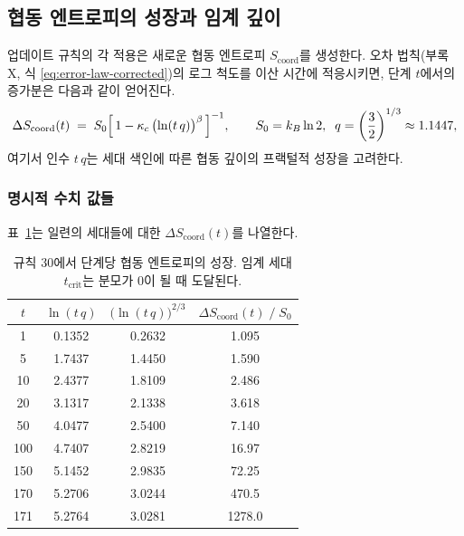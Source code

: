 \documentclass[11pt,a4paper]{article}
\begin{document}
	\subsection{협동 엔트로피의 성장과 임계 깊이}
	\label{subsec:entropy-growth}
	
	업데이트 규칙의 각 적용은 새로운 협동 엔트로피 \(S_{\mathrm{coord}}\)를 생성한다. 오차 법칙(부록 X, 식 \eqref{eq:error-law-corrected})의 로그 척도를 이산 시간에 적응시키면, 단계 \(t\)에서의 증가분은 다음과 같이 얻어진다.
	\begin{equation}
		\Delta S_{\mathrm{coord}}(t) \;=\;
		S_{0}\Bigl[\,1 - \kappa_c\,\bigl(\ln(t\,q)\bigr)^{\beta}\,\Bigr]^{-1},
		\qquad
		S_{0}=k_{B}\ln 2,\;\;
		q = \left(\frac{3}{2}\right)^{1/3}\approx 1.1447,
		\label{eq:deltaS}
	\end{equation}
	여기서 인수 \(t\,q\)는 세대 색인에 따른 협동 깊이의 프랙털적 성장을 고려한다.
	
	\subsubsection*{명시적 수치 값들}
	표~\ref{tab:entropy}는 일련의 세대들에 대한 \(\Delta S_{\mathrm{coord}}(t)\)를 나열한다.
	
	\begin{table}[H]
		\centering
		\caption{규칙 30에서 단계당 협동 엔트로피의 성장. 임계 세대 \(t_{\mathrm{crit}}\)는 분모가 0이 될 때 도달된다.}
		\label{tab:entropy}
		\small
		\begin{tabular}{c c c c}
			\toprule
			\(t\) & \(\ln(t\,q)\) & \(\bigl(\ln(t\,q)\bigr)^{2/3}\) &
			\(\Delta S_{\mathrm{coord}}(t)\;/\;S_{0}\) \\
			\midrule
			1    & 0.1352 & 0.2632 & 1.095  \\
			5    & 1.7437 & 1.4450 & 1.590  \\
			10   & 2.4377 & 1.8109 & 2.486  \\
			20   & 3.1317 & 2.1338 & 3.618  \\
			50   & 4.0477 & 2.5400 & 7.140  \\
			100  & 4.7407 & 2.8219 & 16.97  \\
			150  & 5.1452 & 2.9835 & 72.25  \\
			170  & 5.2706 & 3.0244 & 470.5  \\
			171  & 5.2764 & 3.0281 & 1278.0 \\
			\bottomrule
		\end{tabular}
	\end{table}
	
\end{document}
